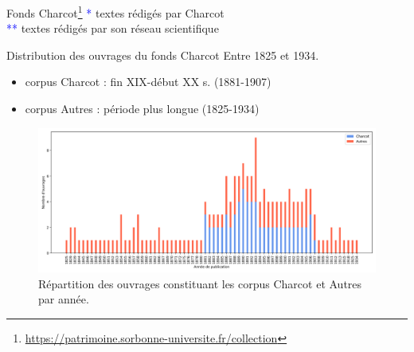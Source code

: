 \begin{frame}{Fonds Charcot\footnote{\url{https://patrimoine.sorbonne-universite.fr/collection}}}
{\small \textcolor{blue}{*} textes rédigés par Charcot \\
	{\small \textcolor{blue}{**} textes rédigés par son réseau scientifique}}
\end{frame}

\begin{frame}{Distribution des ouvrages du fonds Charcot}
	Entre 1825 et 1934. 
	\begin{itemize}
		\item corpus \textrm{Charcot} : fin \textsc{XIX}\ieme{}-début \textsc{XX}\ieme{} s. (1881-1907)
		\item corpus \textrm{Autres} : période plus longue (1825-1934)
	\end{itemize}
	
		\begin{figure}[h]
		\includegraphics[width=\linewidth]{pic/distribution_ouvrages.png}
		\caption{Répartition des ouvrages constituant les corpus \og{}Charcot\fg{} et \og{}Autres\fg{} par année.}
		\label{fig:ling_out_TAL}
	\end{figure}
\end{frame}